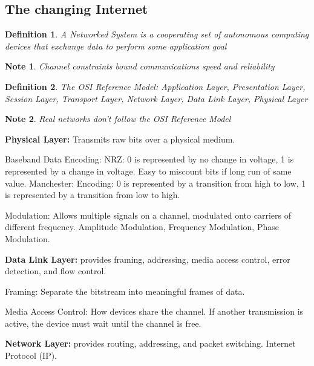 \documentclass{article}
\newtheorem{definition}{Definition}
\newtheorem{note}{Note}
\begin{document}
\subsection*{The changing Internet}

\begin{definition}
    A Networked System is a cooperating set of autonomous computing devices that exchange data to perform some application goal
\end{definition}
\vspace{-15pt}
\begin{note}
    Channel constraints bound communications speed and reliability
\end{note}
\vspace{-15pt}
\begin{definition}
    The OSI Reference Model: Application Layer, Presentation Layer, Session Layer, Transport Layer, Network Layer, Data Link Layer, Physical Layer
\end{definition}
\vspace{-15pt}
\begin{note}
    Real networks don't follow the OSI Reference Model
\end{note}
\vspace{-8pt}

\noindent \textbf{Physical Layer:} Transmits raw bits over a physical medium. 

\noindent Baseband Data Encoding:
\noindent NRZ: 0 is represented by no change in voltage, 1 is represented by a change in voltage. Easy to miscount bits if long run of same value.
\noindent Manchester: Encoding: 0 is represented by a transition from high to low, 1 is represented by a transition from low to high.

\noindent Modulation: Allows multiple signals on a channel, modulated onto carriers of different frequency. Amplitude Modulation, Frequency Modulation, Phase Modulation.


\noindent \textbf{Data Link Layer:} provides framing, addressing, media access control, error detection, and flow control.

\noindent Framing: Separate the bitstream into meaningful frames of data.

\noindent Media Access Control: How devices share the channel. If another transmission is active, the device must wait until the channel is free.


\noindent \textbf{Network Layer:} provides routing, addressing, and packet switching. Internet Protocol (IP).
\end{document}
